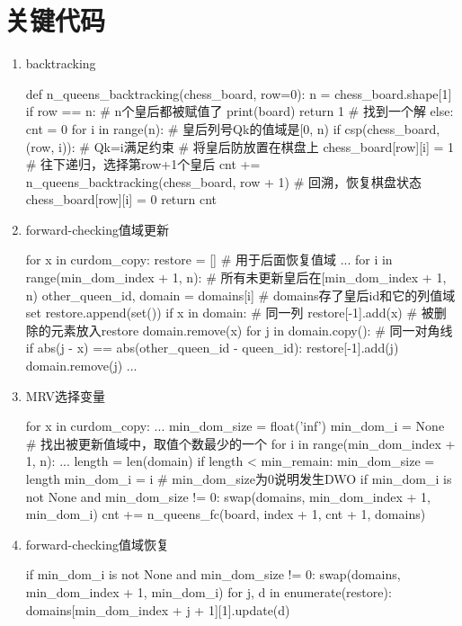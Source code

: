 \documentclass[10pt,letterpaper]{ctexart}
\begin{document}
\newpage
\section{关键代码}
\begin{enumerate}[itemindent=2em,label=\arabic*、]
\item backtracking
\begin{python}
def n_queens_backtracking(chess_board, row=0):
    n = chess_board.shape[1]
    if row == n:    # n个皇后都被赋值了
        print(board)
        return 1    # 找到一个解
    else:
        cnt = 0
        for i in range(n):    # 皇后列号Qk的值域是[0, n)
            if csp(chess_board, (row, i)):  # Qk=i满足约束
                # 将皇后防放置在棋盘上
                chess_board[row][i] = 1
                # 往下递归，选择第row+1个皇后
                cnt += n_queens_backtracking(chess_board, row + 1)
                # 回溯，恢复棋盘状态
                chess_board[row][i] = 0
        return cnt
\end{python}

\item forward-checking值域更新
\begin{python}
for x in curdom_copy:
    restore = []     # 用于后面恢复值域
    ...
    for i in range(min_dom_index + 1, n):   # 所有未更新皇后在[min_dom_index + 1, n)
        other_queen_id, domain = domains[i]   # domains存了皇后id和它的列值域set
        restore.append(set())
        if x in domain:     # 同一列
            restore[-1].add(x)    # 被删除的元素放入restore
            domain.remove(x)
        for j in domain.copy():   # 同一对角线
            if abs(j - x) == abs(other_queen_id - queen_id):
                restore[-1].add(j)
                domain.remove(j)
        ...
\end{python}

\newpage
\item MRV选择变量
\begin{python}
for x in curdom_copy:
    ...
    min_dom_size = float('inf')
    min_dom_i = None
    # 找出被更新值域中，取值个数最少的一个
    for i in range(min_dom_index + 1, n):
        ...
        length = len(domain)
        if length < min_remain:
            min_dom_size = length
            min_dom_i = i
    # min_dom_size为0说明发生DWO
    if min_dom_i is not None and min_dom_size != 0:
        swap(domains, min_dom_index + 1, min_dom_i)
        cnt += n_queens_fc(board, index + 1, cnt + 1, domains)
\end{python}

\item forward-checking值域恢复
\begin{python}
if min_dom_i is not None and min_dom_size != 0:
    swap(domains, min_dom_index + 1, min_dom_i)
for j, d in enumerate(restore):
    domains[min_dom_index + j + 1][1].update(d)
\end{python}

\end{enumerate}
\end{document}
